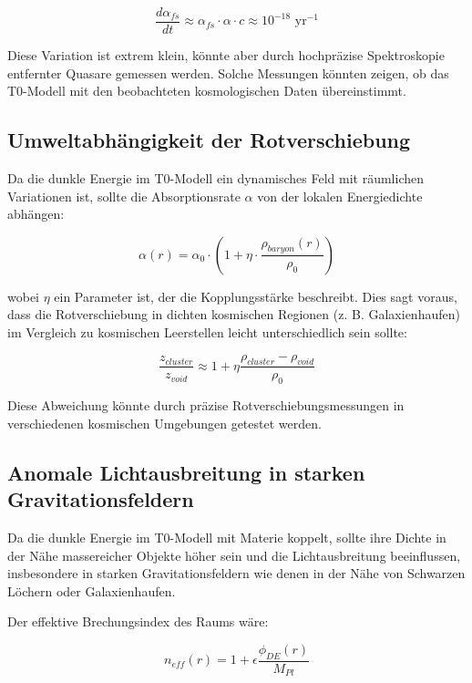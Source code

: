 \documentclass[a4paper,12pt]{article}
\theoremstyle{definition}
\theoremstyle{remark}
\begin{document}
	\begin{equation}
		\frac{d\alpha_{fs}}{dt} \approx \alpha_{fs} \cdot \alpha \cdot c \approx 10^{-18} \text{ yr}^{-1}
	\end{equation}
	
	Diese Variation ist extrem klein, könnte aber durch hochpräzise Spektroskopie entfernter Quasare gemessen werden. Solche Messungen könnten zeigen, ob das T0-Modell mit den beobachteten kosmologischen Daten übereinstimmt.
	
	\subsection{Umweltabhängigkeit der Rotverschiebung}
	Da die dunkle Energie im T0-Modell ein dynamisches Feld mit räumlichen Variationen ist, sollte die Absorptionsrate $\alpha$ von der lokalen Energiedichte abhängen:
	
	\begin{equation}
		\alpha(r) = \alpha_0 \cdot \left(1 + \eta \cdot \frac{\rho_{baryon}(r)}{\rho_0}\right)
	\end{equation}
	
	wobei $\eta$ ein Parameter ist, der die Kopplungsstärke beschreibt. Dies sagt voraus, dass die Rotverschiebung in dichten kosmischen Regionen (z. B. Galaxienhaufen) im Vergleich zu kosmischen Leerstellen leicht unterschiedlich sein sollte:
	
	\begin{equation}
		\frac{z_{cluster}}{z_{void}} \approx 1 + \eta\frac{\rho_{cluster} - \rho_{void}}{\rho_0}
	\end{equation}
	
	Diese Abweichung könnte durch präzise Rotverschiebungsmessungen in verschiedenen kosmischen Umgebungen getestet werden.
	
	\subsection{Anomale Lichtausbreitung in starken Gravitationsfeldern}
	Da die dunkle Energie im T0-Modell mit Materie koppelt, sollte ihre Dichte in der Nähe massereicher Objekte höher sein und die Lichtausbreitung beeinflussen, insbesondere in starken Gravitationsfeldern wie denen in der Nähe von Schwarzen Löchern oder Galaxienhaufen.
	
	Der effektive Brechungsindex des Raums wäre:
	
	\begin{equation}
		n_{eff}(r) = 1 + \epsilon \frac{\phi_{DE}(r)}{M_{Pl}}
	\end{equation}
	
\end{document}
